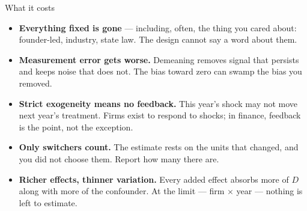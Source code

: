 \documentclass[
  11pt,
  ignorenonframetext,
  aspectratio=169,
]{beamer}
\providecommand{\tightlist}{%
  \setlength{\itemsep}{0pt}\setlength{\parskip}{0pt}}
\begin{document}
\begin{frame}{What it costs}
\protect{}\label{what-it-costs}
\begin{itemize}
\tightlist
\item
  \textbf{Everything fixed is gone} --- including, often, the thing you
  cared about: founder-led, industry, state law. The design cannot say a
  word about them.
\item
  \textbf{Measurement error gets worse.} Demeaning removes signal that
  persists and keeps noise that does not. The bias toward zero can swamp
  the bias you removed.
\item
  \textbf{Strict exogeneity means no feedback.} This year's shock may
  not move next year's treatment. Firms exist to respond to shocks; in
  finance, feedback is the point, not the exception.
\item
  \textbf{Only switchers count.} The estimate rests on the units that
  changed, and you did not choose them. Report how many there are.
\item
  \textbf{Richer effects, thinner variation.} Every added effect absorbs
  more of \(D\) along with more of the confounder. At the limit --- firm
  \(\times\) year --- nothing is left to estimate.
\end{itemize}
\end{frame}
\end{document}
